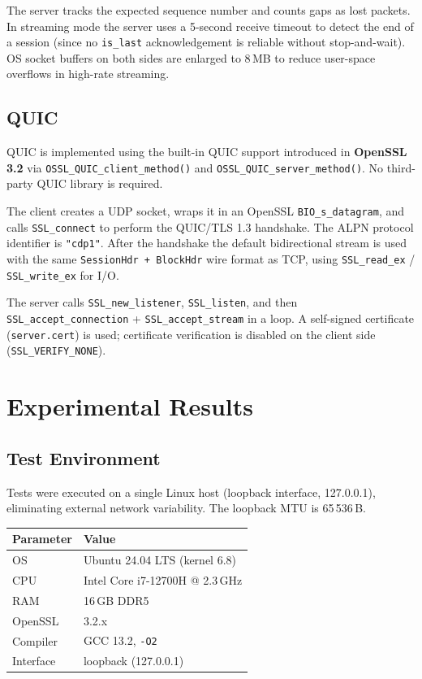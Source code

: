 \documentclass[12pt,a4paper]{article}
\begin{document}
The server tracks the expected sequence number and counts gaps as lost
packets. In streaming mode the server uses a 5-second receive timeout to
detect the end of a session (since no \texttt{is\_last} acknowledgement is
reliable without stop-and-wait). OS socket buffers on both sides are enlarged
to 8\,MB to reduce user-space overflows in high-rate streaming.

\subsection{QUIC}

QUIC is implemented using the built-in QUIC support introduced in
\textbf{OpenSSL 3.2} via \texttt{OSSL\_QUIC\_client\_method()} and
\texttt{OSSL\_QUIC\_server\_method()}. No third-party QUIC library is
required.

The client creates a UDP socket, wraps it in an OpenSSL \texttt{BIO\_s\_datagram},
and calls \texttt{SSL\_connect} to perform the QUIC/TLS 1.3 handshake.  The
ALPN protocol identifier is \texttt{"cdp1"}.  After the handshake the default
bidirectional stream is used with the same \texttt{SessionHdr + BlockHdr}
wire format as TCP, using \texttt{SSL\_read\_ex} / \texttt{SSL\_write\_ex}
for I/O.

The server calls \texttt{SSL\_new\_listener}, \texttt{SSL\_listen}, and then
\texttt{SSL\_accept\_connection} + \texttt{SSL\_accept\_stream} in a loop.
A self-signed certificate (\texttt{server.cert}) is used; certificate
verification is disabled on the client side (\texttt{SSL\_VERIFY\_NONE}).

\section{Experimental Results}
\label{sec:results}

\subsection{Test Environment}

Tests were executed on a single Linux host (loopback interface, 127.0.0.1),
eliminating external network variability. The loopback MTU is 65\,536\,B.

\begin{center}
\begin{tabular}{ll}
\toprule
\textbf{Parameter} & \textbf{Value} \\
\midrule
OS           & Ubuntu 24.04 LTS (kernel 6.8) \\
CPU          & Intel Core i7-12700H @ 2.3\,GHz \\
RAM          & 16\,GB DDR5 \\
OpenSSL      & 3.2.x \\
Compiler     & GCC 13.2, \texttt{-O2} \\
Interface    & loopback (127.0.0.1) \\
\bottomrule
\end{tabular}
\end{center}
\end{document}
